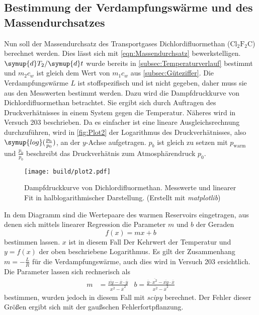 \subsection{Bestimmung der Verdampfungswärme und des Massendurchsatzes}
\label{subsec:Massendurchsatz}
Nun soll der Massendurchsatz des Transportgases Dichlordifluormethan ($\text{Cl}_2\text{F}_2\text{C}$) berechnet werden. Dies lässt sich mit \autoref{eqn:Massendurchsatz} bewerkstelligen. 
$\symup{d}T_2/\symup{d}t$ wurde bereits in \autoref{subsec:Temperaturverlauf} bestimmt und $m_2 c_w$ ist gleich dem Wert von $m_1 c_w$ aus \autoref{subsec:Güteziffer}.
Die Verdampfungswärme $L$ ist stoffspezifisch und ist nicht gegeben, daher muss sie aus den Messwerten bestimmt werden. Dazu wird die Dampfdruckkurve von Dichlordifluormethan
betrachtet. Sie ergibt sich durch Auftragen des Druckverhätnisses in einem System gegen die Temperatur. Näheres wird in Versuch 203 \cite{v203} beschrieben. 
Da es einfacher ist eine lineare Ausgleichsrechnung durchzuführen, wird in \autoref{fig:Plot2} der Logarithmus des Druckverhätnisses, also
$\symup{log}(\frac{p_{\text{b}}}{p_0})$, an der $y$-Achse aufgetragen. $p_b$ ist gleich zu setzen mit $p_\text{warm}$ und $\frac{p_{\text{b}}}{p_0}$ beschreibt das Druckverhätnis
zum Atmosphärendruck $p_0$.

\begin{figure}
  \centering
  \caption{Dampfdruckkurve von Dichlordifluormethan. Messwerte und linearer Fit in halblogarithmischer Darstellung. (Erstellt mit \textit{matplotlib}\cite{matplotlib})}
  \label{fig:Plot2}
  \texttt{[image: build/plot2.pdf]}
\end{figure}

In dem Diagramm sind die Wertepaare des warmen Reservoirs eingetragen, aus denen sich mittels linearer Regression die Parameter $m$ und $b$ der Geraden
\begin{equation*}
  f(x) = mx + b
\end{equation*}
bestimmen lassen. $x$ ist in diesem Fall Der Kehrwert der Temperatur und $y = f(x)$ der oben beschriebene Logarithmus. Es gilt der Zusammenhang $m = - \frac{L}{R}$ für 
die Verdampfungswärme, auch dies wird in Versuch 203 \cite{v203} ersichtlich. Die Parameter lassen sich rechnerisch als
\begin{align*}
  m &= \frac{\overline{xy}-\overline{x} \cdot \overline{y}}{\overline{x^2}-\overline{x}^2} & %
  b = \frac{\overline{y} \cdot \overline{x^2}-\overline{xy} \cdot \overline{x}}{\overline{x^2}-\overline{x}^2}
\end{align*}
bestimmen, wurden jedoch in diesem Fall mit \textit{scipy} \cite{scipy} berechnet. Der Fehler dieser Größen ergibt sich mit der gaußschen Fehlerfortpflanzung.

